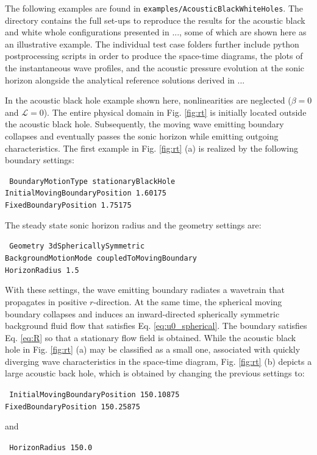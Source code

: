The following examples are found in {\tt examples/AcousticBlackWhiteHoles}. The directory contains the full set-ups to reproduce the results for the acoustic black and white whole configurations presented in ..., some of which are shown here as an illustrative example. The individual test case folders further include python postprocessing scripts in order to produce the space-time diagrams, the plots of the instantaneous wave profiles, and the acoustic pressure evolution at the sonic horizon alongside the analytical reference solutions derived in ...

In the acoustic black hole example shown here, nonlinearities are neglected ($\beta=0$ and $\mathcal{L}=0$). The entire physical domain in Fig. \ref{fig:rt} is initially located outside the acoustic black hole. Subsequently, the moving wave emitting boundary collapses and eventually passes the sonic horizon while emitting outgoing characteristics. The first example in Fig. \ref{fig:rt} (a) is realized by the following boundary settings:

{\tt
BoundaryMotionType stationaryBlackHole \\
InitialMovingBoundaryPosition 1.60175 \\
FixedBoundaryPosition 1.75175
}

The steady state sonic horizon radius and the geometry settings are:

{\tt
Geometry 3dSphericallySymmetric \\
BackgroundMotionMode coupledToMovingBoundary \\
HorizonRadius 1.5
}

With these settings, the wave emitting boundary radiates a wavetrain that propagates in positive $r$-direction. At the same time, the spherical moving boundary collapses and induces an inward-directed spherically symmetric background fluid flow that satisfies Eq. \eqref{eq:u0_spherical}. The boundary satisfies Eq. \eqref{eq:R} so that a stationary flow field is obtained. While the acoustic black hole in Fig. \ref{fig:rt} (a) may be classified as a small one, associated with quickly diverging wave characteristics in the space-time diagram, Fig. \ref{fig:rt} (b) depicts a large acoustic back hole, which is obtained by changing the previous settings to:

{\tt
InitialMovingBoundaryPosition 150.10875  \\
FixedBoundaryPosition 150.25875
}

and

{\tt
HorizonRadius 150.0
}


